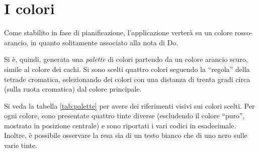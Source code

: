 \section{I colori}

Come stabilito in fase di pianificazione, l'applicazione verterà su un colore rosso-arancio, in quanto solitamente associato alla nota di Do. 

Si è, quindi, generata una \emph{palette} di colori partendo da un colore arancio scuro, simile al colore dei cachi. Si sono scelti quattro colori seguendo la ``regola'' della tetrade cromatica, selezionando dei colori con una distanza di trenta gradi circa (sulla ruota cromatica) dal colore principale.

Si veda la tabella \ref{tab:palette} per avere dei riferimenti visivi sui colori scelti. Per ogni colore, sono presentate quattro tinte diverse (escludendo il colore ``puro'', mostrato in posizione centrale) e sono riportati i vari codici in esadecimale. Inoltre, è possibile osservare la resa sia di un testo bianco che di uno nero sulle varie tinte.

